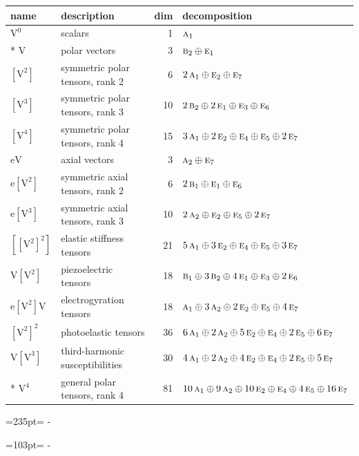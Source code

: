 \documentclass[10pt,a4paper]{article}
\newcommand{\needspace}[1]{\par\penalty-100\begingroup\dimen0=#1\relax\dimen2=\pagegoal
  \advance\dimen2-\pagetotal\ifdim\dimen0>\dimen2\relax\ifdim\dimen2>0pt\vfil\break\fi\fi
  \endgroup}
\numberwithin{equation}{section}
\newcommand{\irr}[1]{\text{\normalfont\scshape #1}}
\newcommand{\jahn}[1]{\mathrm{#1}}
\newlength{\fillwidth}\newlength{\cellwidth}\newlength{\colwidth}
\begin{document}
{\begin{longtable}{@{}llr>{\RaggedRight\arraybackslash}p{\fillwidth}@{}}
name & description & dim & decomposition\\\midrule\endhead
\bottomrule\endfoot\endlastfoot
$\jahn{V^{0}}$ & scalars & 1 & $\irr{a}_{1}$\\*
$\jahn{V}$ & polar vectors & 3 & $\irr{b}_{2} \oplus\allowbreak \irr{e}_{1}$\\
$\jahn{[V^{2}]}$ & symmetric polar tensors, rank 2 & 6 & $2\,\irr{a}_{1} \oplus\allowbreak \irr{e}_{2} \oplus\allowbreak \irr{e}_{7}$\\
$\jahn{[V^{3}]}$ & symmetric polar tensors, rank 3 & 10 & $2\,\irr{b}_{2} \oplus\allowbreak 2\,\irr{e}_{1} \oplus\allowbreak \irr{e}_{3} \oplus\allowbreak \irr{e}_{6}$\\
$\jahn{[V^{4}]}$ & symmetric polar tensors, rank 4 & 15 & $3\,\irr{a}_{1} \oplus\allowbreak 2\,\irr{e}_{2} \oplus\allowbreak \irr{e}_{4} \oplus\allowbreak \irr{e}_{5} \oplus\allowbreak 2\,\irr{e}_{7}$\\
$\jahn{eV}$ & axial vectors & 3 & $\irr{a}_{2} \oplus\allowbreak \irr{e}_{7}$\\
$\jahn{e[V^{2}]}$ & symmetric axial tensors, rank 2 & 6 & $2\,\irr{b}_{1} \oplus\allowbreak \irr{e}_{1} \oplus\allowbreak \irr{e}_{6}$\\
$\jahn{e[V^{3}]}$ & symmetric axial tensors, rank 3 & 10 & $2\,\irr{a}_{2} \oplus\allowbreak \irr{e}_{2} \oplus\allowbreak \irr{e}_{5} \oplus\allowbreak 2\,\irr{e}_{7}$\\
$\jahn{[[V^{2}]^{2}]}$ & elastic stiffness tensors & 21 & $5\,\irr{a}_{1} \oplus\allowbreak 3\,\irr{e}_{2} \oplus\allowbreak \irr{e}_{4} \oplus\allowbreak \irr{e}_{5} \oplus\allowbreak 3\,\irr{e}_{7}$\\
$\jahn{V[V^{2}]}$ & piezoelectric tensors & 18 & $\irr{b}_{1} \oplus\allowbreak 3\,\irr{b}_{2} \oplus\allowbreak 4\,\irr{e}_{1} \oplus\allowbreak \irr{e}_{3} \oplus\allowbreak 2\,\irr{e}_{6}$\\
$\jahn{e[V^{2}]V}$ & electrogyration tensors & 18 & $\irr{a}_{1} \oplus\allowbreak 3\,\irr{a}_{2} \oplus\allowbreak 2\,\irr{e}_{2} \oplus\allowbreak \irr{e}_{5} \oplus\allowbreak 4\,\irr{e}_{7}$\\
$\jahn{[V^{2}]^{2}}$ & photoelastic tensors & 36 & $6\,\irr{a}_{1} \oplus\allowbreak 2\,\irr{a}_{2} \oplus\allowbreak 5\,\irr{e}_{2} \oplus\allowbreak \irr{e}_{4} \oplus\allowbreak 2\,\irr{e}_{5} \oplus\allowbreak 6\,\irr{e}_{7}$\\
$\jahn{V[V^{3}]}$ & third-harmonic susceptibilities & 30 & $4\,\irr{a}_{1} \oplus\allowbreak 2\,\irr{a}_{2} \oplus\allowbreak 4\,\irr{e}_{2} \oplus\allowbreak \irr{e}_{4} \oplus\allowbreak 2\,\irr{e}_{5} \oplus\allowbreak 5\,\irr{e}_{7}$\\*
$\jahn{V^{4}}$ & general polar tensors, rank 4 & 81 & $10\,\irr{a}_{1} \oplus\allowbreak 9\,\irr{a}_{2} \oplus\allowbreak 10\,\irr{e}_{2} \oplus\allowbreak \irr{e}_{4} \oplus\allowbreak 4\,\irr{e}_{5} \oplus\allowbreak 16\,\irr{e}_{7}$\\
\bottomrule\end{longtable}}
\needspace{235pt}
\needspace{103pt}
\end{document}
